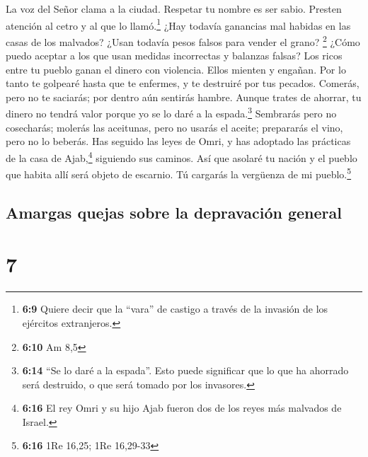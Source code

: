  La voz del Señor clama a la ciudad. Respetar tu nombre es
ser sabio. Presten atención al cetro y al que lo llamó.\footnote{\textbf{6:9}
  Quiere decir que la ``vara'' de castigo a través de la invasión de los
  ejércitos extranjeros.}  ¿Hay todavía ganancias mal
habidas en las casas de los malvados? ¿Usan todavía pesos falsos para
vender el grano? \footnote{\textbf{6:10} Am 8,5}  ¿Cómo
puedo aceptar a los que usan medidas incorrectas y balanzas falsas?
 Los ricos entre tu pueblo ganan el dinero con violencia.
Ellos mienten y engañan.  Por lo tanto te golpearé hasta
que te enfermes, y te destruiré por tus pecados. 
Comerás, pero no te saciarás; por dentro aún sentirás hambre. Aunque
trates de ahorrar, tu dinero no tendrá valor porque yo se lo daré a la
espada.\footnote{\textbf{6:14} ``Se lo daré a la espada''. Esto puede
  significar que lo que ha ahorrado será destruido, o que será tomado
  por los invasores.}  Sembrarás pero no cosecharás;
molerás las aceitunas, pero no usarás el aceite; prepararás el vino,
pero no lo beberás.  Has seguido las leyes de Omri, y has
adoptado las prácticas de la casa de Ajab,\footnote{\textbf{6:16} El rey
  Omri y su hijo Ajab fueron dos de los reyes más malvados de Israel.}
siguiendo sus caminos. Así que asolaré tu nación y el pueblo que habita
allí será objeto de escarnio. Tú cargarás la vergüenza de mi
pueblo.\footnote{\textbf{6:16} 1Re 16,25; 1Re 16,29-33}

\hypertarget{amargas-quejas-sobre-la-depravaciuxf3n-general}{%
\subsection{Amargas quejas sobre la depravación
general}\label{amargas-quejas-sobre-la-depravaciuxf3n-general}}

\hypertarget{section-6}{%
\section{7}\label{section-6}}

